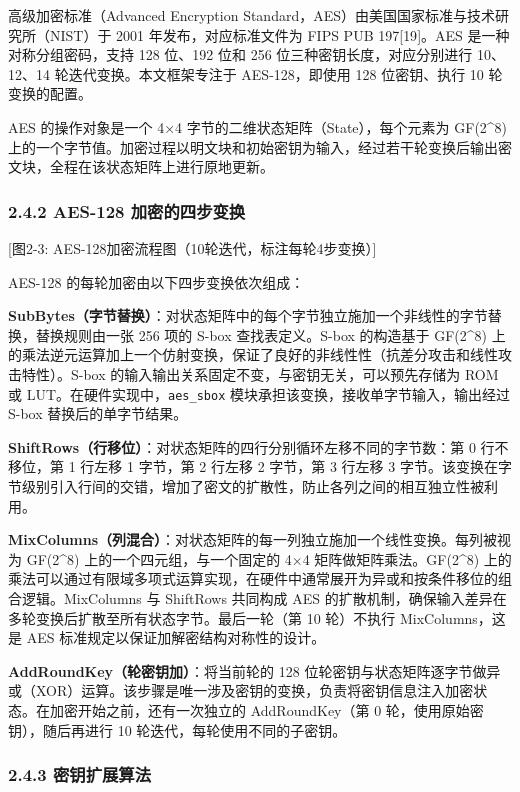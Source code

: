 高级加密标准（Advanced Encryption
Standard，AES）由美国国家标准与技术研究所（NIST）于 2001
年发布，对应标准文件为 FIPS PUB 197{[}19{]}。AES
是一种对称分组密码，支持 128 位、192 位和 256
位三种密钥长度，对应分别进行 10、12、14 轮迭代变换。本文框架专注于
AES-128，即使用 128 位密钥、执行 10 轮变换的配置。

AES 的操作对象是一个 4×4 字节的二维状态矩阵（State），每个元素为
GF(2\^{}8)
上的一个字节值。加密过程以明文块和初始密钥为输入，经过若干轮变换后输出密文块，全程在该状态矩阵上进行原地更新。

\subsubsection{2.4.2 AES-128
加密的四步变换}\label{aes-128-ux52a0ux5bc6ux7684ux56dbux6b65ux53d8ux6362}

{[}图2-3: AES-128加密流程图（10轮迭代，标注每轮4步变换）{]}

AES-128 的每轮加密由以下四步变换依次组成：

\textbf{SubBytes（字节替换）}：对状态矩阵中的每个字节独立施加一个非线性的字节替换，替换规则由一张
256 项的 S-box 查找表定义。S-box 的构造基于 GF(2\^{}8)
上的乘法逆元运算加上一个仿射变换，保证了良好的非线性性（抗差分攻击和线性攻击特性）。S-box
的输入输出关系固定不变，与密钥无关，可以预先存储为 ROM 或
LUT。在硬件实现中，\texttt{aes\_sbox}
模块承担该变换，接收单字节输入，输出经过 S-box 替换后的单字节结果。

\textbf{ShiftRows（行移位）}：对状态矩阵的四行分别循环左移不同的字节数：第
0 行不移位，第 1 行左移 1 字节，第 2 行左移 2 字节，第 3 行左移 3
字节。该变换在字节级别引入行间的交错，增加了密文的扩散性，防止各列之间的相互独立性被利用。

\textbf{MixColumns（列混合）}：对状态矩阵的每一列独立施加一个线性变换。每列被视为
GF(2\^{}8) 上的一个四元组，与一个固定的 4×4 矩阵做矩阵乘法。GF(2\^{}8)
上的乘法可以通过有限域多项式运算实现，在硬件中通常展开为异或和按条件移位的组合逻辑。MixColumns
与 ShiftRows 共同构成 AES
的扩散机制，确保输入差异在多轮变换后扩散至所有状态字节。最后一轮（第 10
轮）不执行 MixColumns，这是 AES 标准规定以保证加解密结构对称性的设计。

\textbf{AddRoundKey（轮密钥加）}：将当前轮的 128
位轮密钥与状态矩阵逐字节做异或（XOR）运算。该步骤是唯一涉及密钥的变换，负责将密钥信息注入加密状态。在加密开始之前，还有一次独立的
AddRoundKey（第 0 轮，使用原始密钥），随后再进行 10
轮迭代，每轮使用不同的子密钥。

\subsubsection{2.4.3
密钥扩展算法}\label{ux5bc6ux94a5ux6269ux5c55ux7b97ux6cd5}

